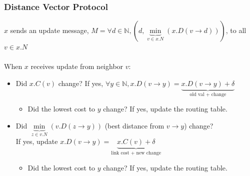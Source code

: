 \documentclass{article}
\begin{document}
  \subsubsection{Distance Vector Protocol}
  $x$ sends an update message, $M = \forall d \in \mathbb{N}, (d, \underbrace{\min}_{v \in x.N}(x.D(v \rightarrow d)))$, to all $v \in x.N$ \\ \\
  When $x$ receives update from neighbor $v$:
  \begin{itemize}
    \item Did $x.C(v)$ change? If yes, $\forall y \in \mathbb{N}, x.D(v \rightarrow y) = \underbrace{x.D(v \rightarrow y) + \delta}_{\text{old val + change}}$
      \begin{itemize}
        \item Did the lowest cost to $y$ change? If yes, update the routing table.
      \end{itemize}
    \item Did $\underbrace{\min}_{z \in v.N}(v.D(z \rightarrow y))$ (best distance from $v \rightarrow y$) change?\\ 
      If yes, update $x.D(v \rightarrow y) = \underbrace{x.C(v) + \delta}_{\text{link cost + new change}}$
      \begin{itemize}
        \item Did the lowest cost to $y$ change? If yes, update the routing table.
      \end{itemize}
  \end{itemize}
\end{document}

